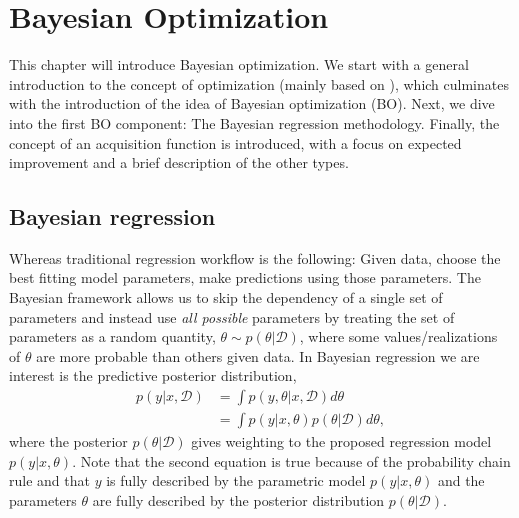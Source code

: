 \chapter{Bayesian Optimization}
This chapter will introduce Bayesian optimization. We start with a general introduction to the
concept of optimization (mainly based on \cite{bayesoptbook}), which culminates with the
introduction of the idea of Bayesian optimization (BO). Next, we dive into the first BO component:
The Bayesian regression methodology. Finally, the concept of an acquisition function is introduced,
with a focus on expected improvement and a brief description of the other types. 





\section{Bayesian regression}
Whereas traditional regression workflow is the following: Given data, choose the best fitting model
parameters, make predictions using those parameters. The Bayesian framework allows us to skip the
dependency of a single set of parameters and instead use \textit{all possible} parameters by treating the set
of parameters as a random quantity, $\theta \sim p(\theta|\mathcal{D})$, where some values/realizations of $\theta$ are more
probable than others given data. In Bayesian regression we are interest is the predictive posterior distribution,  
\begin{align}\label{Predictive2}
    p(y|x, \mathcal{D}) &= \int p(y,\theta|x, \mathcal{D}) d\theta\\
    &= \int p(y|x,\theta)p(\theta|\mathcal{D}) d\theta,
\end{align}
where the posterior $p(\theta|\mathcal{D})$ gives weighting to the proposed regression model
$p(y|x,\theta)$. Note that the second equation is true because of the probability chain rule and
that $y$ is fully described by the parametric model $p(y|x,\theta)$ and the parameters $\theta$ are
fully described by the posterior distribution $p(\theta|\mathcal{D})$.


